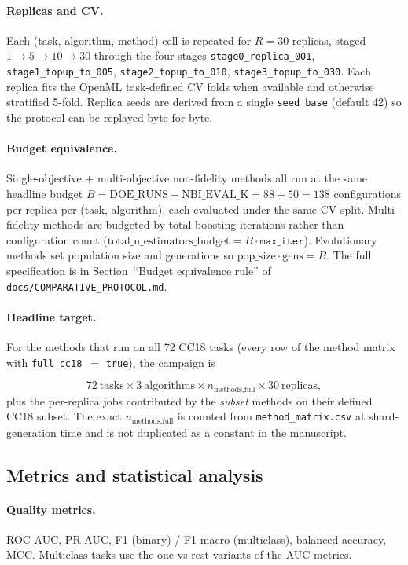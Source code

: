 \paragraph{Replicas and CV.} Each (task, algorithm, method) cell is
repeated for $R{=}30$ replicas, staged $1\!\to\!5\!\to\!10\!\to\!30$
through the four stages \texttt{stage0\_replica\_001},
\texttt{stage1\_topup\_to\_005}, \texttt{stage2\_topup\_to\_010},
\texttt{stage3\_topup\_to\_030}. Each replica fits the OpenML
task-defined CV folds when available and otherwise stratified
5-fold. Replica seeds are derived from a single \texttt{seed\_base}
(default 42) so the protocol can be replayed byte-for-byte.

\paragraph{Budget equivalence.} Single-objective + multi-objective
non-fidelity methods all run at the same headline budget
$B = \mathrm{DOE\_RUNS} + \mathrm{NBI\_EVAL\_K} = 88 + 50 = 138$
configurations per replica per (task, algorithm), each evaluated
under the same CV split. Multi-fidelity methods are budgeted by
total boosting iterations rather than configuration count
($\text{total\_n\_estimators\_budget} = B \cdot \texttt{max\_iter}$).
Evolutionary methods set population size and generations so
$\text{pop\_size} \cdot \text{gens} = B$. The full specification is in
Section~``Budget equivalence rule'' of
\texttt{docs/COMPARATIVE\_PROTOCOL.md}.

\paragraph{Headline target.} For the methods that run on all 72 CC18
tasks (every row of the method matrix with \texttt{full\_cc18}~$=$
\texttt{true}), the campaign is

\[
  72\ \text{tasks} \times 3\ \text{algorithms} \times
  n_{\text{methods,full}} \times 30\ \text{replicas},
\]
plus the per-replica jobs contributed by the \emph{subset} methods on
their defined CC18 subset. The exact $n_{\text{methods,full}}$ is
counted from \texttt{method\_matrix.csv} at shard-generation time and
is not duplicated as a constant in the manuscript.

\subsection{Metrics and statistical analysis}
\label{sec:exp-metrics}
\paragraph{Quality metrics.} ROC-AUC, PR-AUC, F1 (binary) /
F1-macro (multiclass), balanced accuracy, MCC. Multiclass tasks use
the one-vs-rest variants of the AUC metrics.

